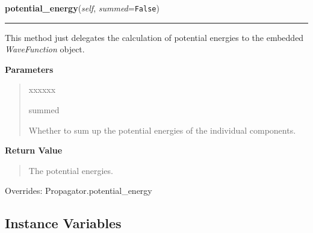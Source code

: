    \vspace{0.5ex}

\hspace{.8\funcindent}\begin{boxedminipage}{\funcwidth}

    \raggedright \textbf{potential\_energy}(\textit{self}, \textit{summed}={\tt False})

    \vspace{-1.5ex}

    \rule{\textwidth}{0.5\fboxrule}
\setlength{\parskip}{2ex}
    This method just delegates the calculation of potential energies to the
    embedded \textit{WaveFunction} object.

\setlength{\parskip}{1ex}
      \textbf{Parameters}
      \vspace{-1ex}

      \begin{quote}
        \begin{Ventry}{xxxxxx}

          \item[summed]

          Whether to sum up the potential energies of the individual
          components.

        \end{Ventry}

      \end{quote}

      \textbf{Return Value}
    \vspace{-1ex}

      \begin{quote}
      The potential energies.

      \end{quote}

      Overrides: Propagator.potential\_energy

    \end{boxedminipage}



  \subsection{Instance Variables}

